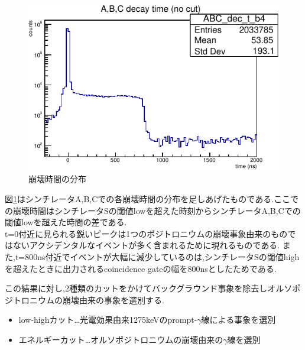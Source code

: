 \begin{figure}[H]
	\begin{center}
		\includegraphics[width=12cm]{fig/isb/decay_t.pdf}
		\caption{崩壊時間の分布}
		\label{fig:dec_t_b4}
	\end{center}
\end{figure}

図\ref{fig:dec_t_b4}はシンチレータA,B,Cでの各崩壊時間の分布を足しあげたものである.ここでの崩壊時間はシンチレータSの閾値lowを超えた時刻からシンチレータA,B,Cでの閾値lowを超えた時間の差である.\\
t=0付近に見られる鋭いピークは1つのポジトロニウムの崩壊事象由来のものではないアクシデンタルなイベントが多く含まれるために現れるものである.
また,t=800ns付近でイベントが大幅に減少しているのは,シンチレータSの閾値highを超えたときに出力されるcoincidence gateの幅を800nsとしたためである.

この結果に対し,2種類のカットをかけてバックグラウンド事象を除去しオルソポジトロニウムの崩壊由来の事象を選別する.
\begin{itemize}
	\item low-highカット…光電効果由来1275keVのprompt-$\gamma$線による事象を選別
	\item エネルギーカット…オルソポジトロニウムの崩壊由来の$\gamma$線を選別
\end{itemize}

